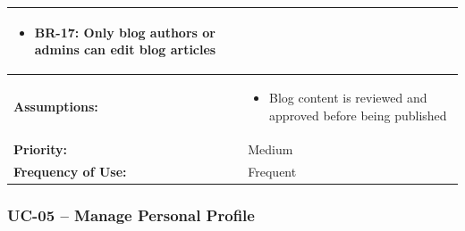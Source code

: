 \documentclass[12pt,a4paper]{article}
\begin{document}
\begin{longtable}{|p{4.5cm}|p{10.5cm}|}
\begin{itemize}
  \item BR-17: Only blog authors or admins can edit blog articles
\end{itemize} \\
\hline
\textbf{Assumptions:} &
\begin{itemize}
  \item Blog content is reviewed and approved before being published
\end{itemize} \\
\hline
\textbf{Priority:} & Medium \\
\hline
\textbf{Frequency of Use:} & Frequent \\
\hline
\end{longtable}


\subsubsection{UC-05 – Manage Personal Profile}
\end{document}

